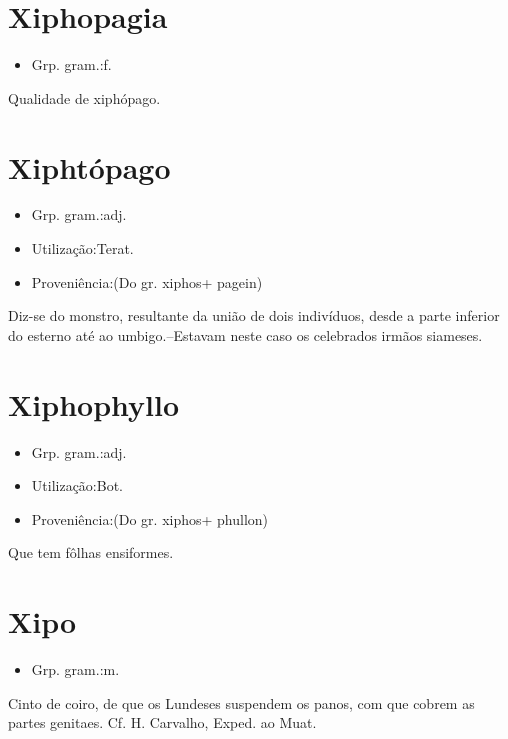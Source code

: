 \section{Xiphopagia}
\begin{itemize}
\item {Grp. gram.:f.}
\end{itemize}
Qualidade de xiphópago.
\section{Xiphtópago}
\begin{itemize}
\item {Grp. gram.:adj.}
\end{itemize}
\begin{itemize}
\item {Utilização:Terat.}
\end{itemize}
\begin{itemize}
\item {Proveniência:(Do gr. \textunderscore xiphos\textunderscore  + \textunderscore pagein\textunderscore )}
\end{itemize}
Diz-se do monstro, resultante da união de dois indivíduos, desde a parte inferior do esterno até ao umbigo.--Estavam neste caso os celebrados irmãos siameses.
\section{Xiphophyllo}
\begin{itemize}
\item {Grp. gram.:adj.}
\end{itemize}
\begin{itemize}
\item {Utilização:Bot.}
\end{itemize}
\begin{itemize}
\item {Proveniência:(Do gr. \textunderscore xiphos\textunderscore  + \textunderscore phullon\textunderscore )}
\end{itemize}
Que tem fôlhas ensiformes.
\section{Xipo}
\begin{itemize}
\item {Grp. gram.:m.}
\end{itemize}
Cinto de coiro, de que os Lundeses suspendem os panos, com que cobrem as partes genitaes. Cf. H. Carvalho, \textunderscore Exped. ao Muat.\textunderscore 
